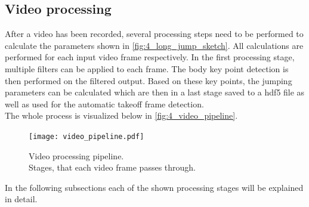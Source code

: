 \subsection{Video processing}\label{subsec:4_body_keypoint_detection}
After a video has been recorded, several processing steps need to be performed
to calculate the parameters shown in \autoref{fig:4_long_jump_sketch}.
All calculations are performed for each input video frame respectively.
In the first processing stage, multiple filters can be applied to each frame.
The body key point detection is then performed on the filtered output. 
Based on these key points, the jumping parameters can be calculated which are
then in a last stage saved to a hdf5 file as well as used for the automatic
takeoff frame detection.\\
The whole process is visualized below in \autoref{fig:4_video_pipeline}.
\begin{figure}[!h]
    \centering
    \texttt{[image: video\_pipeline.pdf]}
    \caption[Video processing pipeline]{Video processing pipeline.\\
    Stages, that each video frame passes through.}
    \label{fig:4_video_pipeline}
\end{figure}
\FloatBarrier
\noindent In the following subsections each of the shown processing stages
will be explained in detail.

